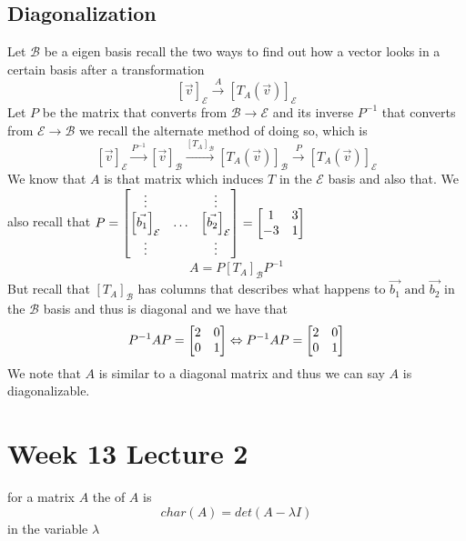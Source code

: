 \documentclass[11pt]{book}
\begin{document}

\subsection{Diagonalization}%
\label{sub:diagonalization}

Let $\mathcal{B} $ be a eigen basis recall the two ways to find out how a vector looks in a certain basis after a transformation 
\[
    \left[ \vec{v}  \right]_{\mathcal{E}} \xrightarrow{A} \left[ T_{A} \left(\vec{v} \right)  \right]_{\mathcal{E}} 
\]
Let $P$ be the matrix that converts from $\mathcal{B} \to \mathcal{E} $ and its inverse $P^{-1} $ that converts from $\mathcal{E} \to \mathcal{B}  $ we recall the alternate method of doing so, which is 
\[
\left[ \vec{v}  \right]_{\mathcal{E}} \xrightarrow{P^{-1} } \left[ \vec{v}  \right]_{\mathcal{B}} \xrightarrow{\left[ T_{A}  \right]_{\mathcal{B}} } \left[ T_{A} \left(\vec{v} \right)  \right]_{\mathcal{B}} \xrightarrow{P} \left[ T_{A} \left(\vec{v} \right)  \right]_{\mathcal{E}} 
\]
We know that $A$ is that matrix which induces $T$ in the $\mathcal{E} $ basis and also that. We also recall that $P= \mat[b]{ \vdots  &  & \vdots  \\ \left[ \vec{b_1}  \right]_{\mathcal{E}}  & \ldots  & \left[ \vec{b_2}  \right]_{\mathcal{E}}  \\ \vdots  &  & \vdots  } = \mat[b]{ 1 & 3 \\ -3 & 1 }$ 
\[
A= P\left[ T_{A}  \right]_{\mathcal{B}} P^{-1} 
\]
But recall that $\left[ T_{A}  \right]_{\mathcal{B}} $ has columns that describes what happens to $\vec{b_1} \text{ and } \vec{b_2}  $ in the $\mathcal{B} $ basis and thus is diagonal and we have that
\[
P^{-1} AP= \mat[b]{ 2 & 0 \\ 0 & 1 } \Leftrightarrow P^{-1} A P= \mat[b]{ 2 & 0 \\ 0 & 1 }
\]
We note that $A$ is similar to a diagonal matrix and thus we can say $A$ is diagonalizable.




\section{Week 13 Lecture 2}%
\label{sec:week_13_lecture_2}

\begin{defn}\label{defn:characteristic_polynomial}
    for a matrix $A$ the  of $A$ is \[
    char\left(A\right) = \mathit{det} \left(A - \lambda I\right) 
    \]
    in the variable $\lambda $ 
\end{defn}
\end{document}
